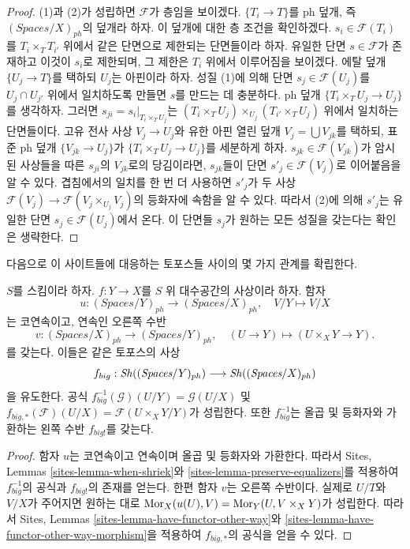 \begin{proof}
(1)과 (2)가 성립하면 $\mathcal{F}$가 층임을 보이겠다.
$\{T_i \to T\}$를 ph 덮개, 즉 $(\textit{Spaces}/X)_{ph}$의 덮개라 하자.
이 덮개에 대한 층 조건을 확인하겠다. $s_i \in \mathcal{F}(T_i)$를
$T_i \times_T T_{i'}$ 위에서 같은 단면으로 제한되는 단면들이라 하자.
유일한 단면 $s \in \mathcal{F}$가 존재하고 이것이 $s_i$로 제한되며,
그 제한은 $T_i$ 위에서 이루어짐을 보이겠다.
에탈 덮개 $\{U_j \to T\}$를 택하되 $U_j$는 아핀이라 하자. 성질 (1)에
의해 단면 $s_j \in \mathcal{F}(U_j)$를 $U_j \cap U_{j'}$ 위에서
일치하도록 만들면 $s$를 만드는 데 충분하다.
ph 덮개 $\{T_i \times_T U_j \to U_j\}$를 생각하자. 그러면
$s_{ji} = s_i|_{T_i \times_T U_j}$는
$(T_i \times_T U_j) \times_{U_j} (T_{i'} \times_T U_j)$ 위에서 일치하는
단면들이다. 고유 전사 사상 $V_j \to U_j$와 유한 아핀 열린 덮개
$V_j = \bigcup V_{jk}$를 택하되, 표준 ph 덮개
$\{V_{jk} \to U_j\}$가 $\{T_i \times_T U_j \to U_j\}$를 세분하게 하자.
$s_{jk} \in \mathcal{F}(V_{jk})$가 암시된 사상들을 따른 $s_{ji}$의
$V_{jk}$로의 당김이라면, $s_{jk}$들이 단면
$s'_j \in \mathcal{F}(V_j)$로 이어붙음을
알 수 있다. 겹침에서의 일치를 한 번 더 사용하면 $s'_j$가 두 사상
$\mathcal{F}(V_j) \to \mathcal{F}(V_j \times_{U_j} V_j)$의 등화자에
속함을 알 수 있다. 따라서 (2)에 의해 $s'_j$는 유일한 단면
$s_j \in \mathcal{F}(U_j)$에서 온다. 이 단면들 $s_j$가 원하는 모든
성질을 갖는다는 확인은 생략한다.
\end{proof}

\noindent
다음으로 이 사이트들에 대응하는 토포스들 사이의 몇 가지 관계를 확립한다.

\begin{lemma}
\label{lemma-morphism-big-ph}
$S$를 스킴이라 하자. $f : Y \to X$를 $S$ 위 대수공간의 사상이라 하자.
함자
$$
u : (\textit{Spaces}/Y)_{ph} \longrightarrow (\textit{Spaces}/X)_{ph},
\quad
V/Y \longmapsto V/X
$$
는 코연속이고, 연속인 오른쪽 수반
$$
v : (\textit{Spaces}/X)_{ph} \longrightarrow (\textit{Spaces}/Y)_{ph},
\quad
(U \to Y) \longmapsto (U \times_X Y \to Y).
$$
를 갖는다. 이들은 같은 토포스의 사상
$$
f_{big} :
\mathop{\mathit{Sh}}\nolimits((\textit{Spaces}/Y)_{ph})
\longrightarrow
\mathop{\mathit{Sh}}\nolimits((\textit{Spaces}/X)_{ph})
$$
을 유도한다. 공식
$f_{big}^{-1}(\mathcal{G})(U/Y) = \mathcal{G}(U/X)$ 및
$f_{big, *}(\mathcal{F})(U/X) = \mathcal{F}(U \times_X Y/Y)$가 성립한다.
또한 $f_{big}^{-1}$는 올곱 및 등화자와 가환하는 왼쪽 수반 $f_{big!}$를
갖는다.
\end{lemma}

\begin{proof}
함자 $u$는 코연속이고 연속이며 올곱 및 등화자와 가환한다. 따라서 Sites,
Lemmas \ref{sites-lemma-when-shriek}와
\ref{sites-lemma-preserve-equalizers}를 적용하여 $f_{big}^{-1}$의 공식과
$f_{big!}$의 존재를 얻는다. 한편 함자 $v$는 오른쪽 수반이다. 실제로
$U/T$와 $V/X$가 주어지면 원하는 대로
$\mathop{\mathrm{Mor}}\nolimits_X(u(U), V) = \mathop{\mathrm{Mor}}\nolimits_Y(U, V \times_X Y)$가 성립한다.
따라서 Sites, Lemmas \ref{sites-lemma-have-functor-other-way}와
\ref{sites-lemma-have-functor-other-way-morphism}을 적용하여 $f_{big, *}$의
공식을 얻을 수 있다.
\end{proof}

